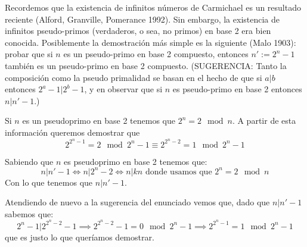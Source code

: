 \begin{problem}[14]
Recordemos que la existencia de infinitos números de Carmichael es
un resultado reciente (Alford, Granville, Pomerance 1992). Sin
embargo, la existencia de infinitos pseudo-primos (verdaderos, o
sea, no primos) en base 2 era bien conocida. Posiblemente la
demostración más simple es la siguiente (Malo 1903): probar que si
$n$ es un pseudo-primo en base 2 compuesto, entonces $n':=2^n-1$
también es un pseudo-primo en base 2 compuesto. (SUGERENCIA: Tanto
la composición como la pseudo primalidad se basan en el hecho de
que si $a\vert b$ entonces $2^a-1\vert 2^b-1$, y en observar que
si $n$ es pseudo-primo en base 2 entonces $n\vert n'-1$.)
\solution


Si $n$ es un pseudoprimo en base 2 tenemos que $2^n=2 \mod n$. A partir de esta información queremos demostrar que
\[2^{2^n-1}=2 \mod 2^n-1 \equiv 2^{2^n-2} = 1 \mod 2^n-1\]

Sabiendo que $n$ es pseudoprimo en base 2 tenemos que:
\[n|n'-1 \iff n| 2^n-2 \iff n|kn \text{ donde usamos que } 2^n=2 \mod n\]
Con lo que tenemos que $n|n'-1$.

Atendiendo de nuevo a la sugerencia del enunciado vemos que, dado que $n|n'-1$ sabemos que:
\[2^n-1 | 2^{2^n-2}-1 \implies 2^{2^n-2}-1 = 0 \mod 2^n-1 \implies 2^{2^n-1} = 1 \mod 2^n-1\]
que es justo lo que queríamos demostrar.

\end{problem}

